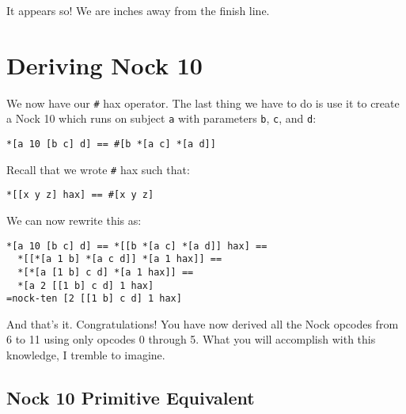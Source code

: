 \documentclass[twoside]{article}
\begin{document}
It appears so! We are inches away from the finish line.

\section{Deriving Nock 10}

We now have our \lstinline[style=inlinecode]{#} hax operator. The last thing we have to do is use it to create a Nock 10 which runs on subject \lstinline[style=inlinecode]{a} with parameters \lstinline[style=inlinecode]{b}, \lstinline[style=inlinecode]{c}, and \lstinline[style=inlinecode]{d}:

\begin{lstlisting}[style=listingcode]
*[a 10 [b c] d] == #[b *[a c] *[a d]]
\end{lstlisting}

Recall that we wrote \lstinline[style=inlinecode]{#} hax such that:

\begin{lstlisting}[style=listingblock]
*[[x y z] hax] == #[x y z]
\end{lstlisting}

We can now rewrite this as:

\begin{lstlisting}[style=listingblock]
*[a 10 [b c] d] == *[[b *[a c] *[a d]] hax] ==
  *[[*[a 1 b] *[a c d]] *[a 1 hax]] ==
  *[*[a [1 b] c d] *[a 1 hax]] ==
  *[a 2 [[1 b] c d] 1 hax]
=nock-ten [2 [[1 b] c d] 1 hax]
\end{lstlisting}

And that's it. Congratulations! You have now derived all the Nock opcodes from 6 to 11 using only opcodes 0 through 5. What you will accomplish with this knowledge, I tremble to imagine.

\subsection*{Nock 10 Primitive Equivalent}
\end{document}
